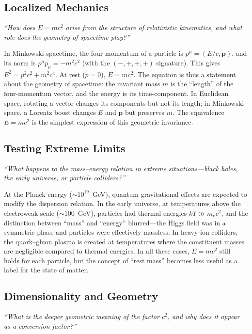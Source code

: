 \subsection*{Localized Mechanics}
\textit{``How does $E = mc^{2}$ arise from the structure of relativistic kinematics, and what role does the geometry of spacetime play?''}

In Minkowski spacetime, the four-momentum of a particle is $p^{\mu} = (E/c, \mathbf{p})$, and its norm is $p^{\mu}p_{\mu} = -m^{2}c^{2}$ (with the $(-,+,+,+)$ signature). This gives $E^{2} = p^{2}c^{2} + m^{2}c^{4}$. At rest ($p = 0$), $E = mc^{2}$. The equation is thus a statement about the geometry of spacetime: the invariant mass $m$ is the ``length'' of the four-momentum vector, and the energy is its time-component. In Euclidean space, rotating a vector changes its components but not its length; in Minkowski space, a Lorentz boost changes $E$ and $\mathbf{p}$ but preserves $m$. The equivalence $E = mc^{2}$ is the simplest expression of this geometric invariance.

\subsection*{Testing Extreme Limits}
\textit{``What happens to the mass--energy relation in extreme situations---black holes, the early universe, or particle colliders?''}

At the Planck energy ($\sim 10^{19}$~GeV), quantum gravitational effects are expected to modify the dispersion relation. In the early universe, at temperatures above the electroweak scale ($\sim 100$~GeV), particles had thermal energies $kT \gg m_{e}c^{2}$, and the distinction between ``mass'' and ``energy'' blurred---the Higgs field was in a symmetric phase and particles were effectively massless. In heavy-ion colliders, the quark--gluon plasma is created at temperatures where the constituent masses are negligible compared to thermal energies. In all these cases, $E = mc^{2}$ still holds for each particle, but the concept of ``rest mass'' becomes less useful as a label for the state of matter.

\subsection*{Dimensionality and Geometry}
\textit{``What is the deeper geometric meaning of the factor $c^{2}$, and why does it appear as a conversion factor?''}

